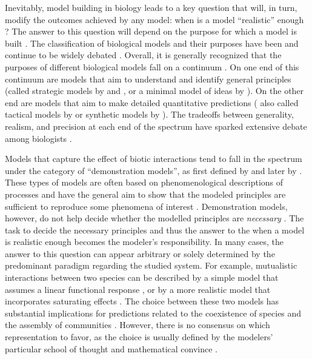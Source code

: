 \documentclass[12pt]{article}
\begin{document}
Inevitably, model building in biology leads to a key question that will, in turn, modify the outcomes achieved by any model: when is a model ``realistic'' enough \citep{stouffer2019all}? The answer to this question will depend on the purpose for which a model is built \citep{odenbaugh2005idealized,levins2006strategies}. The classification of biological models and their purposes have been and continue to be widely debated \citep{holling1966strategy,may2019stability,lewontin1963models,levins1966strategy,orzack1993critical,levins1993response,odenbaugh2005idealized,weisberg2006forty,evans2013simple}. Overall, it is generally recognized that the purposes of different biological models fall on a continuum \citep{levins1993response,evans2013simple,servedio2014not}. On one end of this continuum are models that aim to understand and identify general principles (called strategic models by \citet{holling1966strategy} and \citet{may2019stability}, or a minimal model of ideas by \citet{roughgarden2018adaptive}). On the other end are models that aim to make detailed quantitative predictions ( also called tactical models by \citet{holling1966strategy} or synthetic models by \citet{roughgarden2018adaptive}). The tradeoffs between generality, realism, and precision at each end of the spectrum have sparked extensive debate among biologists \citep{levins1966strategy,orzack1993critical,levins1993response,weisberg2006forty}.

Models that capture the effect of biotic interactions tend to fall in the spectrum under the category of ``demonstration models'', as first defined by \citep{crick1988mad} and later by \citep{evans2013simple}. These types of models are often based on phenomenological descriptions of processes and have the general aim to show that the modeled principles are sufficient to reproduce some phenomena of interest \citep{crick1988mad,evans2013simple}.  Demonstration models, however, do not help decide whether the modelled principles are \textit{necessary} \citep{evans2013simple}. The task to decide the necessary principles and thus the answer to the when a model is realistic enough becomes the modeler's responsibility. In many cases, the answer to this question can appear arbitrary or solely determined by the predominant paradigm regarding the studied system. For example, mutualistic interactions between two species can be described by a simple model that assumes a linear functional response \citep{bascompte2006asymmetric}, or by a more realistic model that incorporates saturating effects \citep{holland2002population}.  The choice between these two models has substantial implications for predictions related to the coexistence of species and the assembly of communities \citep{holland2002population}. However, there is no consensus on which representation to favor, as the choice is usually defined by the modelers' particular school of thought and mathematical convince \citep{holland2006comment, bascompte2006response}.
\end{document}
